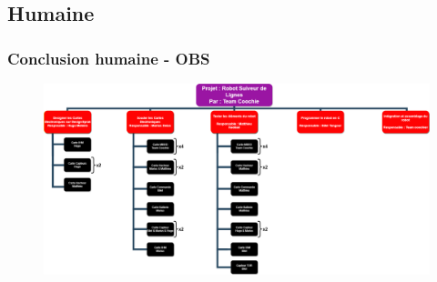\subsection{Humaine}
\begin{frame}
    \frametitle{Conclusion humaine - OBS}
    \begin{figure}[H]
            \centering
            \includegraphics[width=0.8\linewidth]{Images/OBS.drawio.png}
    \end{figure}

\footer{\hfill\insertframenumber/\inserttotalframenumber}
\end{frame}